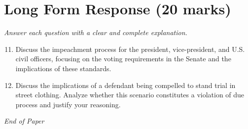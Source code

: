 \documentclass[12pt]{article}
\begin{document}
\section*{Long Form Response (20 marks)}
\textit{Answer each question with a clear and complete explanation.}
\begin{enumerate}[label=\arabic*.]
\setcounter{enumi}{10}
\item Discuss the impeachment process for the president, vice-president, and U.S. civil officers, focusing on the voting requirements in the Senate and the implications of these standards.
\item Discuss the implications of a defendant being compelled to stand trial in street clothing. Analyze whether this scenario constitutes a violation of due process and justify your reasoning.
\end{enumerate}

\vfill
\noindent\textit{End of Paper}
\end{document}
